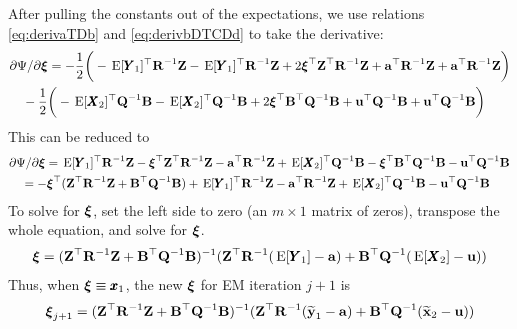 \documentclass[]{article}
\def\xixi{\mbox{\boldmath $\xi$}}
\def\UPS{\mbox{\boldmath $\Upsilon$}}
\def\XI{\mbox{\boldmath $\Xi$}}
\def\BB{\mbox{$\mathbf B$}}	\def\bb{\mbox{$\mathbf b$}} \def\Bb{\mbox{$\mathbf J$}} \def\Ba{\mbox{$\mathbf L$}} \def\Bm{\UPS}
\def\E{\,\textup{\textrm{E}}}
\def\QQ{\mbox{$\mathbf Q$}}	 \def\qq{\mbox{$\mathbf q$}} \def\Qb{\mbox{$\mathbf G$}}  \def\Qm{\mathbb{Q}}
\def\RR{\mbox{$\mathbf R$}}	 \def\rr{\mbox{$\mathbf r$}} \def\Rb{\mbox{$\mathbf H$}}	\def\Rm{\mathbb{R}}
\def\XX{\mbox{$\pmb{X}$}}	\def\xx{\mbox{$\pmb{x}$}}
\def\YY{\mbox{$\pmb{Y}$}}	\def\yy{\mbox{$\pmb{y}$}}
\def\ZZ{\mbox{$\mathbf Z$}}	\def\zz{\mbox{$\mathbf z$}}	\def\Zb{\mbox{$\mathbf M$}} \def\Za{\mbox{$\mathbf N$}} \def\Zm{\XI}
\begin{document}
After pulling the constants out of the expectations, we use relations \eqref{eq:derivaTDb} and \eqref{eq:derivbDTCDd} to take the derivative:
\begin{equation}\label{eq:pi.unconstrained.V0.is.0.t.1.1}
\begin{split}
&\partial\Psi/\partial\xixi = -\frac{1}{2} \bigg(-\E[\YY_1]^\top\RR^{-1}\ZZ - \E[ \YY_1]^\top\RR^{-1}\ZZ 
 + 2 \xixi^\top\ZZ^\top\RR^{-1}\ZZ + \aa^\top\RR^{-1}\ZZ  +  \aa^\top\RR^{-1}\ZZ \bigg) \\
&\quad-\frac{1}{2} \bigg(-\E[\XX_2]^\top\QQ^{-1}\BB - \E[ \XX_2]^\top\QQ^{-1}\BB 
 + 2 \xixi^\top\BB^\top\QQ^{-1}\BB + \uu^\top\QQ^{-1}\BB  +  \uu^\top\QQ^{-1}\BB \bigg) 
\end{split}
\end{equation}
This can be reduced to
\begin{equation}\label{}
\begin{split}
&\partial\Psi/\partial\xixi = \E[\YY_1]^\top\RR^{-1}\ZZ - \xixi^\top\ZZ^\top\RR^{-1}\ZZ - \aa^\top\RR^{-1}\ZZ 
 + \E[\XX_2]^\top\QQ^{-1}\BB - \xixi^\top\BB^\top\QQ^{-1}\BB - \uu^\top\QQ^{-1}\BB \\
&\quad =  - \xixi^\top(\ZZ^\top\RR^{-1}\ZZ + \BB^\top\QQ^{-1}\BB) + \E[\YY_1]^\top\RR^{-1}\ZZ - \aa^\top\RR^{-1}\ZZ 
+ \E[\XX_2]^\top\QQ^{-1}\BB - \uu^\top\QQ^{-1}\BB
\end{split}
\end{equation}
To solve for $\xixi$, set the left side to zero (an $m \times 1$ matrix of zeros), transpose the whole equation, and solve for $\xixi$.  
\begin{equation}\label{eq:pi.unconstrained.V0.is.0.t.1.2}
\begin{split}
\xixi = (\ZZ^\top\RR^{-1}\ZZ + \BB^\top\QQ^{-1}\BB)^{-1}(\ZZ^\top\RR^{-1}(\E[\YY_1]-\aa) +\BB^\top\QQ^{-1}(\E[\XX_2]  - \uu)) \\
\end{split}
\end{equation}
Thus, when $\xixi \equiv \xx_1$,  the new $\xixi$ for EM iteration $j+1$ is
\begin{equation}\label{eq:pi.unconstrained.V0.is.0.t.1.3}
\begin{split}
\xixi_{j+1} = (\ZZ^\top\RR^{-1}\ZZ + \BB^\top\QQ^{-1}\BB)^{-1}(\ZZ^\top\RR^{-1}(\widetilde{\mbox{$\mathbf y$}}_1-\aa) +\BB^\top\QQ^{-1}(\widetilde{\mbox{$\mathbf x$}}_2  - \uu))
\end{split}
\end{equation}
\end{document}
